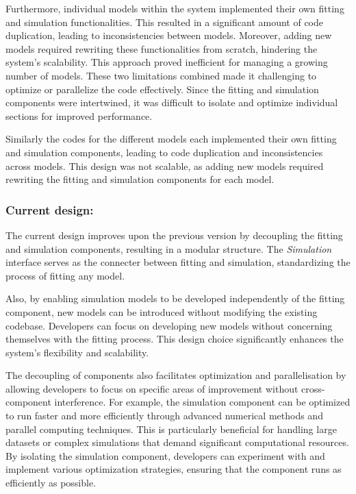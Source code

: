 Furthermore, individual models within the system implemented their own fitting and simulation functionalities. This resulted in a 
significant amount of code duplication, leading to inconsistencies between models. Moreover, adding new models required rewriting 
these functionalities from scratch, hindering the system's scalability. This approach proved inefficient for managing a growing number 
of models. These two limitations combined made it challenging to optimize or parallelize the code effectively. Since the fitting and 
simulation components were intertwined, it was difficult to isolate and optimize individual sections for improved performance.

\medskip

Similarly the codes for the different models each implemented their own fitting and simulation
components, leading to code duplication and inconsistencies across models. This design was not
scalable, as adding new models required rewriting the fitting and simulation components for each
model.

\subsubsection*{Current design:}

The current design improves upon the previous version by decoupling the fitting and 
simulation components, resulting in a modular structure. The \textit{Simulation} interface serves
 as the connecter between fitting and simulation, standardizing the process of fitting 
 any model.

\medskip

Also, by enabling simulation models to be developed independently of the fitting component, 
new models can be introduced without modifying the existing codebase. Developers can 
focus on developing new models without concerning themselves with the fitting process. 
This design choice significantly enhances the system's flexibility and scalability.

\medskip

The decoupling of components also facilitates optimization and 
parallelisation by allowing developers to focus on specific areas of improvement without
cross-component interference. For example, the simulation component can be optimized to
run faster and more efficiently through advanced numerical methods and parallel 
computing techniques. This is particularly beneficial for handling large datasets or complex simulations that demand significant 
computational resources. By isolating the simulation component, developers can experiment with and implement various optimization strategies, 
ensuring that the component runs as efficiently as possible.

